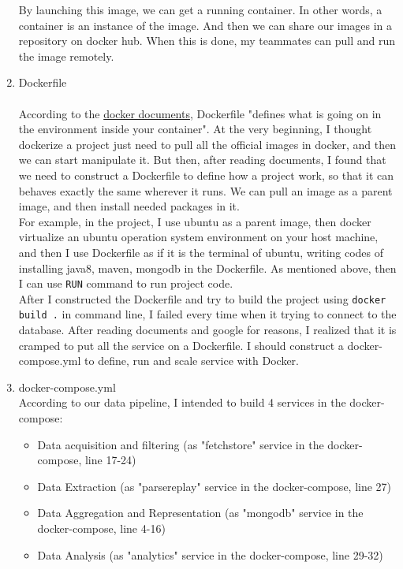 \documentclass{article}
\newcommand{\codeinline}[1]{
    \texttt{#1}
}
\begin{document}
\begin{enumerate}
    By launching this image, we can get a running container. In other words, a container is an instance of the image. And then we can share our images in a repository on docker hub. When this is done, my teammates can pull and run the image remotely.\\

    \item Dockerfile\\\\
    According to the \href{https://docs.docker.com/}{docker documents}, Dockerfile "defines what is going on in the environment inside your container". At the very beginning, I thought dockerize a project just need to pull all the official images in docker, and then we can start manipulate it. But then, after reading documents, I found that we need to construct a Dockerfile to define how a project work, so that it can behaves exactly the same wherever it runs. We can pull an image as a parent image, and then install needed packages in it. \\

    For example, in the project, I use ubuntu as a parent image, then docker virtualize an ubuntu operation system environment on your host machine, and then I use Dockerfile as if it is the terminal of ubuntu, writing codes of installing java8, maven, mongodb in the Dockerfile. As mentioned above, then I can use \codeinline{RUN} command to run project code.\\

    After I constructed the Dockerfile and try to build the project using \codeinline{docker build .} in command line, I failed every time when it trying to connect to the database. After reading documents and google for reasons, I realized that it is cramped to put all the service on a Dockerfile. I should construct a docker-compose.yml to define, run and scale service with Docker. \\

    \item docker-compose.yml\\

    According to our data pipeline, I intended to build 4 services in the docker-compose:\\
    \begin{itemize}
        \item Data acquisition and filtering (as "fetchstore" service in the docker-compose, line 17-24)
        \item Data Extraction (as "parsereplay" service in the docker-compose, line 27)
        \item Data Aggregation and Representation (as "mongodb" service in the docker-compose, line 4-16)
        \item Data Analysis (as "analytics" service in the docker-compose, line 29-32)\\
    \end{itemize}


\end{enumerate}
\end{document}
